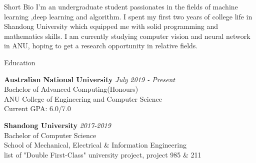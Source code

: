 \documentclass{resume} %
\begin{document}
\begin{rSection}{Short Bio}
	I’m an undergraduate student passionates in the fields of machine learning ,deep learning and algorithm. I spent my first two years of college life in Shandong University which equipped me with solid programming and mathematics skills. I am currently studying computer vision and neural network in ANU, hoping to get a research opportunity in relative fields.
\end{rSection}

\begin{rSection}{Education}

{\bf Australian National University} \hfill {\em July 2019 - Present} 
\\ Bachelor of Advanced Computing(Honours)
\\ ANU College of Engineering and Computer Science\\
 { Current GPA: 6.0/7.0 }
 
 {\bf Shandong University} \hfill {\em 2017-2019} 
\\ Bachelor of Computer Science
\\ School of Mechanical, Electrical \& Information Engineering
\\ list of "Double First-Class" university project, project 985 \& 211


\end{rSection}
\end{document}
